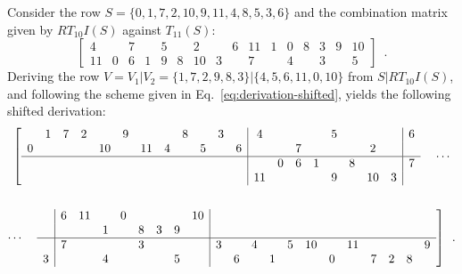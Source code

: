 \begin{example}
    \cite[216]{Starr1984}
    \label{ex:derivation-shifted}
    Consider the row $S = \{ 0, 1, 7, 2, 10, 9, 11, 4, 8, 5, 3, 6 \}$ and the combination matrix given by $RT_{10}I(S)$ against $T_{11}(S)$:
    \begin{equation}
        \left[
        \begin{array}{cccccccc|cccccccc}
            4 && 7 && 5 && 2 && 6 & 11 & 1 & 0 & 8 & 3 & 9 & 10 \\
            11 & 0 & 6 & 1 & 9 & 8 & 10 & 3 && 7 && 4 && 3 && 5
        \end{array}
        \right] \enspace.
    \end{equation}
    Deriving the row $V = V_1 | V_2 = \{ 1, 7, 2, 9, 8, 3 \} | \{ 4, 5, 6, 11, 0, 10 \}$ from $S | RT_{10}I(S)$, and following the scheme given in Eq.~\ref{eq:derivation-shifted}, yields the following shifted derivation:
    \begin{multline}
        \left[
        \begin{array}{cccccccccccc|cccccccc|c}
            & 1 & 7 & 2 && 9 &&& 8 && 3 && 4 &&&& 5 &&&& 6 \\
            0 &&&& 10 && 11 & 4 && 5 && 6 & && 7 &&&& 2 && \\
            \hline
            &&&&&&&&&&&& & 0 & 6 & 1 && 8 &&& 7 \\
            &&&&&&&&&&&& 11 &&&& 9 && 10 & 3 &
        \end{array}
        \right. \quad \cdots \\\\
        \cdots \quad \left. \begin{array}{c|cccccccc|cccccccccccc}
            & 6 & 11 && 0 &&&& 10 &&&&&&&&&&& \\
            & && 1 && 8 & 3 & 9 & &&&&&&&&&&& \\
            \hline
            & 7 &&&& 3 &&& & 3 && 4 && 5 & 10 && 11 &&&& 9 \\
            3 &&& 4 &&&& 5 & && 6 && 1 &&& 0 && 7 & 2 & 8
        \end{array} \right] \enspace.
    \end{multline}
\end{example}

